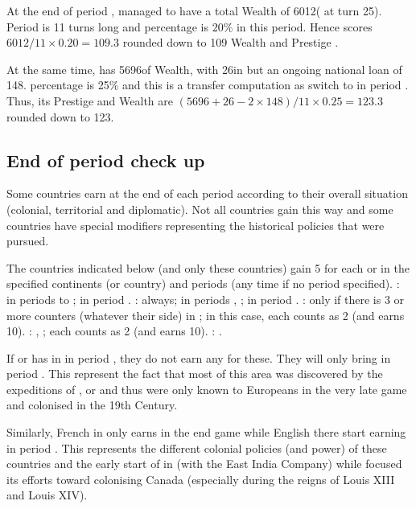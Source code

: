 
\begin{exemple}
  At the end of period , \TUR managed to have a total Wealth of
  6012\ducats ( at turn 25). Period  is
  11 turns long and \TUR percentage is 20\% in this period. Hence \TUR scores
  $6012 / 11 \times 0.20 = 109.3$ rounded down to 109 Wealth and Prestige
  \VPs.

  At the same time, \VEN has 5696\ducats of Wealth, with 26\ducats in \RT but
  an ongoing national loan of 148\ducats. \VEN percentage is 25\% and this is
  a transfer computation as \VEN switch to \AUS in period . Thus,
  its Prestige and Wealth \VPs are $(5696 + 26 - 2 \times 148) / 11 \times
  0.25 = 123.3$ rounded down to 123\VPs.
\end{exemple}

\subsection{End of period check up}
\aparag Some countries earn \VPs at the end of each period according
to their overall situation (colonial, territorial and diplomatic).
\bparag Not all countries gain \VPs this way and some countries have special
modifiers representing the historical policies that were pursued.

 The countries indicated below (and only
these countries) gain 5 \VPs for each \COL or \TP in the specified
continents (or country) and periods (any time if no period specified).
\bparag \ANG: \continentIndia in periods  to ;
\granderegionOceania in period .
\bparag \FRA: \continentAmerica always; \continentIndia in periods
, ; \granderegionOceania in period .
\bparag \POR: \continentAmerica only if there is 3 or more \POR \COL counters
(whatever their side) in \continentBrazil; in this case, each \COL\faceplus
counts as 2 \COL (and earns 10\VPs).
\bparag \RUS: \paysChine, \continentAmerica; each \COL\faceplus counts as 2
\COL (and earns 10\VPs).
\bparag \SUE: \continentAmerica.

\begin{designnote}
  If \ANG or \FRA has \COL in \granderegionOceania in period , they
  do not earn any \VPs for these. They will only bring \VPs in period
  . This represent the fact that most of this area was discovered
  by the expeditions of \leaderCook, \leaderBougainville or  and thus were only known to Europeans in the very late game and
  colonised in the 19th Century.

  Similarly, French \COL in \continentIndia only earns \VPs in the end game
  while English \COL there start earning \VPs in period . This
  represents the different colonial policies (and power) of these countries
  and the early start of \ANG in \continentIndia (with the East India Company)
  while \FRA focused its efforts toward colonising Canada (especially during
  the reigns of Louis XIII and Louis XIV).
\end{designnote}

